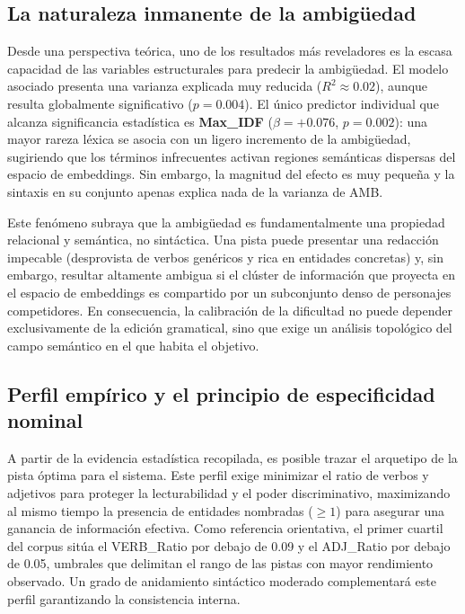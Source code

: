 \documentclass[../main.tex]{subfiles}
\begin{document}
\subsection{La naturaleza inmanente de la ambigüedad}

Desde una perspectiva teórica, uno de los resultados más reveladores es la escasa capacidad de las variables estructurales para predecir la ambigüedad. El modelo asociado presenta una varianza explicada muy reducida ($R^2 \approx 0.02$), aunque resulta globalmente significativo ($p = 0.004$). El único predictor individual que alcanza significancia estadística es \textbf{Max\_IDF} ($\beta = +0.076$, $p = 0.002$): una mayor rareza léxica se asocia con un ligero incremento de la ambigüedad, sugiriendo que los términos infrecuentes activan regiones semánticas dispersas del espacio de embeddings. Sin embargo, la magnitud del efecto es muy pequeña y la sintaxis en su conjunto apenas explica nada de la varianza de AMB.

Este fenómeno subraya que la ambigüedad es fundamentalmente una propiedad relacional y semántica, no sintáctica. Una pista puede presentar una redacción impecable (desprovista de verbos genéricos y rica en entidades concretas) y, sin embargo, resultar altamente ambigua si el clúster de información que proyecta en el espacio de embeddings es compartido por un subconjunto denso de personajes competidores. En consecuencia, la calibración de la dificultad no puede depender exclusivamente de la edición gramatical, sino que exige un análisis topológico del campo semántico en el que habita el objetivo.

\subsection{Perfil empírico y el principio de especificidad nominal}

A partir de la evidencia estadística recopilada, es posible trazar el arquetipo de la pista óptima para el sistema. Este perfil exige minimizar el ratio de verbos y adjetivos para proteger la lecturabilidad y el poder discriminativo, maximizando al mismo tiempo la presencia de entidades nombradas ($\geq 1$) para asegurar una ganancia de información efectiva. Como referencia orientativa, el primer cuartil del corpus sitúa el VERB\_Ratio por debajo de 0.09 y el ADJ\_Ratio por debajo de 0.05, umbrales que delimitan el rango de las pistas con mayor rendimiento observado. Un grado de anidamiento sintáctico moderado complementará este perfil garantizando la consistencia interna.
\end{document}
